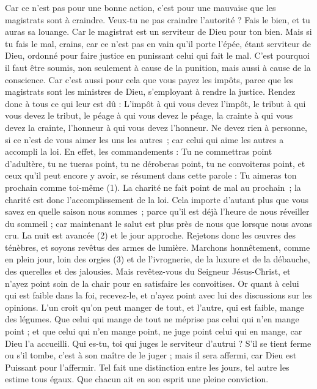 \begin{multicols}{2}
Car ce n’est pas pour une bonne action, c’est pour une mauvaise que les magistrats sont à craindre. Veux-tu ne pas craindre l’autorité ? Fais le bien, et tu auras sa louange.
Car le magistrat est un serviteur de Dieu pour ton bien. Mais si tu fais le mal, crains, car ce n’est pas en vain qu’il porte l'épée, étant serviteur de Dieu, ordonné pour faire justice en punissant celui qui fait le mal.
C'est pourquoi il faut être soumis, non seulement à cause de la punition, mais aussi à cause de la conscience.
Car c'est aussi pour cela que vous payez les impôts, parce que les magistrats sont les ministres de Dieu, s'employant à rendre la justice.
Rendez donc à tous ce qui leur est dû : L’impôt à qui vous devez l’impôt, le tribut à qui vous devez le tribut, le péage à qui vous devez le péage, la crainte à qui vous devez la crainte, l’honneur à qui vous devez l'honneur.
Ne devez rien à personne, si ce n’est de vous aimer les uns les autres ; car celui qui aime les autres a accompli la loi.
En effet, les commandements : Tu ne commettras point d’adultère, tu ne tueras point, tu ne déroberas point, tu ne convoiteras point, et ceux qu’il peut encore y avoir, se résument dans cette parole : Tu aimeras ton prochain comme toi-même (1).
La charité ne fait point de mal au prochain ; la charité est donc l'accomplissement de la loi.
Cela importe d’autant plus que vous savez en quelle saison nous sommes ; parce qu'il est déjà l’heure de nous réveiller du sommeil ; car maintenant le salut est plus près de nous que lorsque nous avons cru.
La nuit est avancée (2) et le jour approche. Rejetons donc les œuvres des ténèbres, et soyons revêtus des armes de lumière.
Marchons honnêtement, comme en plein jour, loin des orgies (3) et de l’ivrognerie, de la luxure et de la débauche, des querelles et des jalousies.
Mais revêtez-vous du Seigneur Jésus-Christ, et n'ayez point soin de la chair pour en satisfaire les convoitises.
\VerseOne{}Or quant à celui qui est faible dans la foi, recevez-le, et n'ayez point avec lui des discussions sur les opinions.
L'un croit qu'on peut manger de tout, et l'autre, qui est faible, mange des légumes.
Que celui qui mange de tout ne méprise pas celui qui n'en mange point ; et que celui qui n'en mange point, ne juge point celui qui en mange, car Dieu l'a accueilli.
Qui es-tu, toi qui juges le serviteur d'autrui ? S’il se tient ferme ou s'il tombe, c’est à son maître de le juger ; mais il sera affermi, car Dieu est Puissant pour l'affermir.
Tel fait une distinction entre les jours, tel autre les estime tous égaux. Que chacun ait en son esprit une pleine conviction.

\end{multicols}
